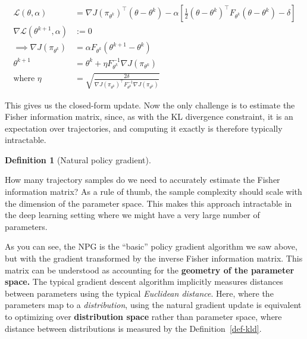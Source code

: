 \documentclass[
  letterpaper,
  DIV=11,
  numbers=noendperiod]{scrreprt}
\theoremstyle{plain}
\theoremstyle{plain}
\theoremstyle{definition}
\theoremstyle{definition}
\newtheorem{definition}{Definition}[chapter]
\theoremstyle{remark}
\begin{document}
\[
\begin{aligned}
    \mathcal{L}(\theta, \alpha)                     & = \nabla J(\pi_{\theta^k})^\top (\theta - \theta^k) - \alpha \left[ \frac{1}{2} (\theta - \theta^k)^\top F_{\theta^k} (\theta - \theta^k) - \delta \right] \\
    \nabla \mathcal{L}(\theta^{k+1}, \alpha) & := 0                                                                                                                                                             \\
    \implies \nabla J(\pi_{\theta^k})        & = \alpha F_{\theta^k} (\theta^{k+1} - \theta^k)                                                                                                                   \\
    \theta^{k+1}                           & = \theta^k + \eta F_{\theta^k}^{-1} \nabla J(\pi_{\theta^k})                                                                                             \\
    \text{where } \eta                     & = \sqrt{\frac{2 \delta}{\nabla J(\pi_{\theta^k})^\top F_{\theta^k}^{-1} \nabla J(\pi_{\theta^k})}}
\end{aligned}
\]

This gives us the closed-form update. Now the only challenge is to
estimate the Fisher information matrix, since, as with the KL divergence
constraint, it is an expectation over trajectories, and computing it
exactly is therefore typically intractable.

\begin{definition}[Natural policy
gradient]\protect\hypertarget{def-npg}{}\label{def-npg}

How many trajectory samples do we need to accurately estimate the Fisher
information matrix? As a rule of thumb, the sample complexity should
scale with the dimension of the parameter space. This makes this
approach intractable in the deep learning setting where we might have a
very large number of parameters.

\end{definition}

As you can see, the NPG is the ``basic'' policy gradient algorithm we
saw above, but with the gradient transformed by the inverse Fisher
information matrix. This matrix can be understood as accounting for the
\textbf{geometry of the parameter space.} The typical gradient descent
algorithm implicitly measures distances between parameters using the
typical \emph{Euclidean distance}. Here, where the parameters map to a
\emph{distribution}, using the natural gradient update is equivalent to
optimizing over \textbf{distribution space} rather than parameter space,
where distance between distributions is measured by the
Definition~\ref{def-kld}.
\end{document}
